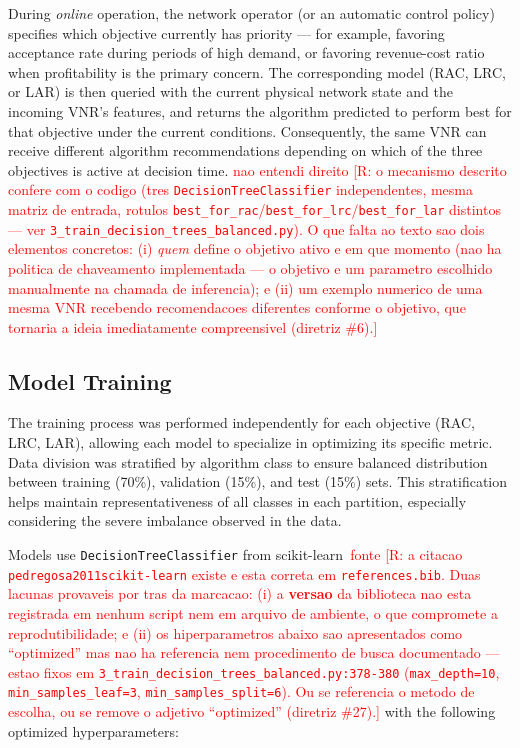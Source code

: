 \documentclass[runningheads]{llncs}
\begin{document}
During \textit{online} operation, the network operator (or an automatic control policy) specifies which objective currently has priority --- for example, favoring acceptance rate during periods of high demand, or favoring revenue-cost ratio when profitability is the primary concern. The corresponding model (RAC, LRC, or LAR) is then queried with the current physical network state and the incoming VNR's features, and returns the algorithm predicted to perform best for that objective under the current conditions. Consequently, the same VNR can receive different algorithm recommendations depending on which of the three objectives is active at decision time. \textcolor{red}{nao entendi direito} \textcolor{red}{[R: o mecanismo descrito confere com o codigo (tres \texttt{DecisionTreeClassifier} independentes, mesma matriz de entrada, rotulos \texttt{best\_for\_rac}/\texttt{best\_for\_lrc}/\texttt{best\_for\_lar} distintos --- ver \texttt{3\_train\_decision\_trees\_balanced.py}). O que falta ao texto sao dois elementos concretos: (i) \emph{quem} define o objetivo ativo e em que momento (nao ha politica de chaveamento implementada --- o objetivo e um parametro escolhido manualmente na chamada de inferencia); e (ii) um exemplo numerico de uma mesma VNR recebendo recomendacoes diferentes conforme o objetivo, que tornaria a ideia imediatamente compreensivel (diretriz \#6).]}

\subsection{Model Training}

The training process was performed independently for each objective (RAC, LRC, LAR), allowing each model to specialize in optimizing its specific metric. Data division was stratified by algorithm class to ensure balanced distribution between training (70\%), validation (15\%), and test (15\%) sets. This stratification helps maintain representativeness of all classes in each partition, especially considering the severe imbalance observed in the data.

Models use \texttt{DecisionTreeClassifier} from scikit-learn~\cite{pedregosa2011scikit-learn}\textcolor{red}{fonte} \textcolor{red}{[R: a citacao \texttt{pedregosa2011scikit-learn} existe e esta correta em \texttt{references.bib}. Duas lacunas provaveis por tras da marcacao: (i) a \textbf{versao} da biblioteca nao esta registrada em nenhum script nem em arquivo de ambiente, o que compromete a reprodutibilidade; e (ii) os hiperparametros abaixo sao apresentados como ``optimized'' mas nao ha referencia nem procedimento de busca documentado --- estao fixos em \texttt{3\_train\_decision\_trees\_balanced.py:378-380} (\texttt{max\_depth=10}, \texttt{min\_samples\_leaf=3}, \texttt{min\_samples\_split=6}). Ou se referencia o metodo de escolha, ou se remove o adjetivo ``optimized'' (diretriz \#27).]} with the following optimized hyperparameters:
\end{document}
